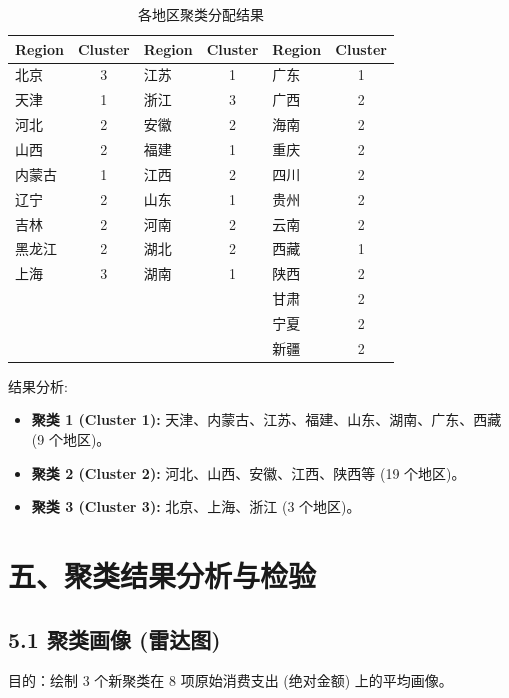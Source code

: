 \documentclass[12pt, a4paper]{article}
\begin{document}
\begin{table}[H]
    \centering
    \caption{各地区聚类分配结果}
    \label{tab:cluster_assignment}
    \begin{tabularx}{\textwidth}{X|c|X|c|X|c}
        \toprule
        \textbf{Region} & \textbf{Cluster} & \textbf{Region} & \textbf{Cluster} & \textbf{Region} & \textbf{Cluster} \\
        \midrule
        北京 & 3 & 江苏 & 1 & 广东 & 1 \\
        天津 & 1 & 浙江 & 3 & 广西 & 2 \\
        河北 & 2 & 安徽 & 2 & 海南 & 2 \\
        山西 & 2 & 福建 & 1 & 重庆 & 2 \\
        内蒙古 & 1 & 江西 & 2 & 四川 & 2 \\
        辽宁 & 2 & 山东 & 1 & 贵州 & 2 \\
        吉林 & 2 & 河南 & 2 & 云南 & 2 \\
        黑龙江 & 2 & 湖北 & 2 & 西藏 & 1 \\
        上海 & 3 & 湖南 & 1 & 陕西 & 2 \\
        \multicolumn{4}{c|}{} & 甘肃 & 2 \\
        \multicolumn{4}{c|}{} & 宁夏 & 2 \\
        \multicolumn{4}{c|}{} & 新疆 & 2 \\
        \bottomrule
    \end{tabularx}
\end{table}

\noindent 结果分析:
\begin{itemize}
    \item \textbf{聚类 1 (Cluster 1):} 天津、内蒙古、江苏、福建、山东、湖南、广东、西藏 (9 个地区)。
    \item \textbf{聚类 2 (Cluster 2):} 河北、山西、安徽、江西、陕西等 (19 个地区)。
    \item \textbf{聚类 3 (Cluster 3):} 北京、上海、浙江 (3 个地区)。
\end{itemize}

\section*{\centering 五、聚类结果分析与检验}
\subsection*{5.1 聚类画像 (雷达图)}
\noindent 目的：绘制 3 个新聚类在 8 项原始消费支出 (绝对金额) 上的平均画像。
\end{document}
